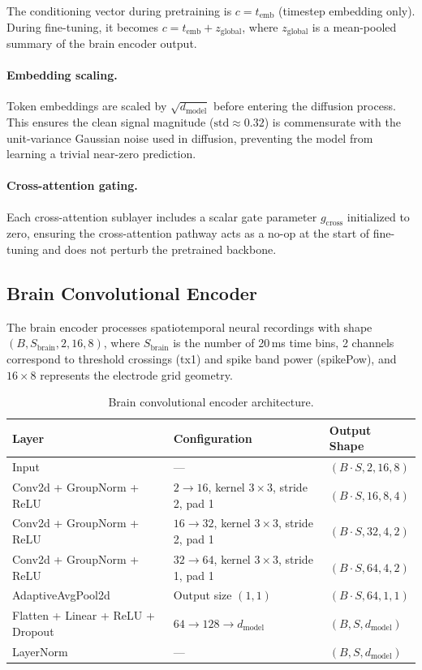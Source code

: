 \documentclass{article}
\begin{document}
\noindent The conditioning vector during pretraining is $c = t_{\text{emb}}$ (timestep embedding only). During fine-tuning, it becomes $c = t_{\text{emb}} + z_{\text{global}}$, where $z_{\text{global}}$ is a mean-pooled summary of the brain encoder output.
 
\paragraph{Embedding scaling.} Token embeddings are scaled by $\sqrt{d_{\text{model}}}$ before entering the diffusion process. This ensures the clean signal magnitude ($\mathrm{std} \approx 0.32$) is commensurate with the unit-variance Gaussian noise used in diffusion, preventing the model from learning a trivial near-zero prediction.
 
\paragraph{Cross-attention gating.} Each cross-attention sublayer includes a scalar gate parameter $g_{\text{cross}}$ initialized to zero, ensuring the cross-attention pathway acts as a no-op at the start of fine-tuning and does not perturb the pretrained backbone.
 
\subsection{Brain Convolutional Encoder}
 
The brain encoder processes spatiotemporal neural recordings with shape $(B, S_{\text{brain}}, 2, 16, 8)$, where $S_{\text{brain}}$ is the number of 20\,ms time bins, 2 channels correspond to threshold crossings (tx1) and spike band power (spikePow), and $16 \times 8$ represents the electrode grid geometry.
 
\begin{table}[h]
\centering
\caption{Brain convolutional encoder architecture.}
\label{tab:brain_encoder}
\begin{tabular}{lll}
\toprule
\textbf{Layer} & \textbf{Configuration} & \textbf{Output Shape} \\
\midrule
Input & --- & $(B \cdot S, 2, 16, 8)$ \\
Conv2d + GroupNorm + ReLU & $2 \rightarrow 16$, kernel $3 \times 3$, stride 2, pad 1 & $(B \cdot S, 16, 8, 4)$ \\
Conv2d + GroupNorm + ReLU & $16 \rightarrow 32$, kernel $3 \times 3$, stride 2, pad 1 & $(B \cdot S, 32, 4, 2)$ \\
Conv2d + GroupNorm + ReLU & $32 \rightarrow 64$, kernel $3 \times 3$, stride 1, pad 1 & $(B \cdot S, 64, 4, 2)$ \\
AdaptiveAvgPool2d & Output size $(1, 1)$ & $(B \cdot S, 64, 1, 1)$ \\
Flatten + Linear + ReLU + Dropout & $64 \rightarrow 128 \rightarrow d_{\text{model}}$ & $(B, S, d_{\text{model}})$ \\
LayerNorm & --- & $(B, S, d_{\text{model}})$ \\
\bottomrule
\end{tabular}
\end{table}
 
\end{document}
